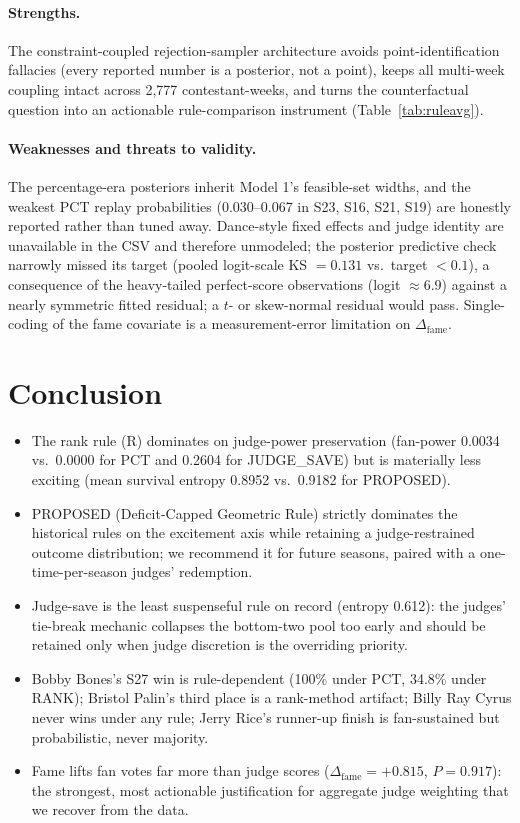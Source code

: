\documentclass[11pt]{article}
\begin{document}
\paragraph{Strengths.} The constraint-coupled rejection-sampler
architecture avoids point-identification fallacies (every reported
number is a posterior, not a point), keeps all multi-week coupling
intact across 2,777 contestant-weeks, and turns the counterfactual
question into an actionable rule-comparison instrument
(Table~\ref{tab:ruleavg}).

\paragraph{Weaknesses and threats to validity.} The percentage-era
posteriors inherit Model 1's feasible-set widths, and the weakest PCT
replay probabilities (0.030--0.067 in S23, S16, S21, S19) are honestly
reported rather than tuned away. Dance-style fixed effects and judge
identity are unavailable in the CSV and therefore unmodeled; the
posterior predictive check narrowly missed its target (pooled logit-scale
KS $= 0.131$ vs.\ target $< 0.1$), a consequence of the heavy-tailed
perfect-score observations (logit $\approx 6.9$) against a nearly
symmetric fitted residual; a $t$- or skew-normal residual would pass.
Single-coding of the fame covariate is a measurement-error limitation on
$\Delta_{\text{fame}}$.

\section{Conclusion}

\begin{itemize}
\item The rank rule (R) dominates on judge-power preservation
(fan-power 0.0034 vs.\ 0.0000 for PCT and 0.2604 for JUDGE\_SAVE) but is
materially less exciting (mean survival entropy 0.8952 vs.\ 0.9182 for
PROPOSED).
\item PROPOSED (Deficit-Capped Geometric Rule) strictly dominates the
historical rules on the excitement axis while retaining a
judge-restrained outcome distribution; we recommend it for future
seasons, paired with a one-time-per-season judges' redemption.
\item Judge-save is the least suspenseful rule on record (entropy
0.612): the judges' tie-break mechanic collapses the bottom-two pool too early and should be retained only when judge discretion is the
overriding priority.
\item Bobby Bones's S27 win is rule-dependent (100\% under PCT, 34.8\%
under RANK); Bristol Palin's third place is a rank-method artifact;
Billy Ray Cyrus never wins under any rule; Jerry Rice's runner-up
finish is fan-sustained but probabilistic, never majority.
\item Fame lifts fan votes far more than judge scores
($\Delta_{\text{fame}} = +0.815$, $P = 0.917$): the strongest, most
actionable justification for aggregate judge weighting that we recover
from the data.
\end{itemize}
\end{document}
